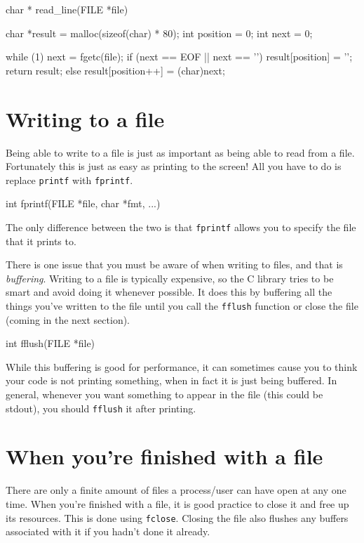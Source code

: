 \begin{codeblock}
char *
read_line(FILE *file)
{
    char *result = malloc(sizeof(char) * 80);
    int position = 0;
    int next = 0;

    while (1) {
        next = fgetc(file);
        if (next == EOF || next == '\n') {
            result[position] = '\0';
            return result;
        } else {
            result[position++] = (char)next;
        }
    }
}
\end{codeblock}

\section{Writing to a file}

Being able to write to a file is just as important as being able to read from a file.
Fortunately this is just as easy as printing to the screen!
All you have to do is replace \texttt{printf} with \texttt{fprintf}.

\begin{codeinline}
int fprintf(FILE *file, char *fmt, ...)
\end{codeinline}

The only difference between the two is that \texttt{fprintf} allows you to specify the file that it prints to.

There is one issue that you must be aware of when writing to files, and that is \emph{buffering}. 
Writing to a file is typically expensive, so the C library tries to be smart and avoid doing it whenever possible.
It does this by buffering all the things you've written to the file until you call the \texttt{fflush} function or close the file (coming in the next section).

\begin{codeinline}
int fflush(FILE *file)
\end{codeinline}

While this buffering is good for performance, it can sometimes cause you to think your code is not printing something, when in fact it is just being buffered.
In general, whenever you want something to appear in the file (this could be stdout), you should \texttt{fflush} it after printing.

\section{When you're finished with a file}

There are only a finite amount of files a process/user can have open at any one time.
When you're finished with a file, it is good practice to close it and free up its resources.
This is done using \texttt{fclose}.
Closing the file also flushes any buffers associated with it if you hadn't done it already.

